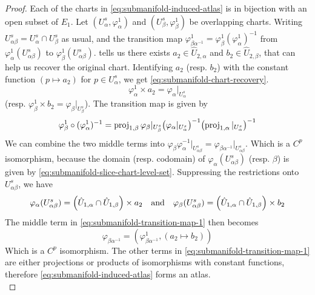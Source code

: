 \documentclass[../main-manifolds.tex]{subfiles}
\begin{document}
\begin{proof}
    Each of the charts in \cref{eq:submanifold-induced-atlas} is in bijection with an open subset of $E_1$. Let $(U^s_{\alpha}, \varphi^1_\alpha)$ and $(U^s_{\beta}, \varphi^1_\beta)$ be overlapping charts. Writing $U^s_{\alpha\beta} = U^s_{\alpha}\cap U^s_{\beta}$ as usual, and the transition map $\varphi^1_{\beta\alpha^{-1}} = \varphi^1_{\beta}(\varphi^1_{\alpha})^{-1}$ from $\varphi_{\alpha}^1(U_{\alpha\beta}^s)$ to $\varphi_{\beta}^1(U_{\alpha\beta}^s)$.  tells us there exists $a_2\in \hat{U}_{2,\alpha}$ and $b_2\in \hat{U}_{2,\beta}$, that can help us recover the original chart. Identifying $a_2$ (resp. $b_2$) with the constant function $(p\mapsto a_2)$ for $p\in U_{\alpha}^s$, we get \cref{eq:submanifold-chart-recovery}.
    \begin{equation}\label{eq:submanifold-chart-recovery}
    \varphi^1_{\alpha}\times a_2 = \varphi_{\alpha}\vert_{U^s_{\alpha}}
    \end{equation}
    (resp. $\varphi^1_{\beta}\times b_2 = \varphi_{\beta}\vert_{U^s_{\beta}}$). The transition map is given by
    \begin{equation}\label{eq:submanifold-transition-map-1}
    \varphi^1_{\beta}\circ (\varphi^1_{\alpha})^{-1} = \operatorname{proj}_{1,\beta}\varphi_{\beta}\vert_{U^s_{\beta}}\qty(\varphi_{\alpha}\vert_{U^s_{\alpha}})^{-1}\qty(\operatorname{proj}_{1,\alpha}\vert_{U^s_{\alpha}})^{-1}    
    \end{equation}
    We can combine the two middle terms into $\varphi_{\beta}\varphi_{\alpha}^{-1}\vert_{U^s_{\alpha\beta}}=\varphi_{\beta\alpha^{-1}}\vert_{U^s_{\alpha\beta}}$. Which is a $C^p$ isomorphism, because the domain (resp. codomain) of $\varphi_{\alpha}(U^s_{\alpha\beta})$ (resp. $\beta$) is given by \cref{eq:submanifold-slice-chart-level-set}. Suppressing the restrictions onto $U^s_{\alpha\beta}$, we have
    \[
        \varphi_{\alpha}(U^s_{\alpha\beta}) = \qty(\hat{U}_{1,\alpha}\cap\hat{U}_{1,\beta})\times a_2 \qqtext{and}\varphi_{\beta}(U^s_{\alpha\beta}) = \qty(\hat{U}_{1,\alpha}\cap\hat{U}_{1,\beta})\times b_2
    \]
    The middle term in \cref{eq:submanifold-transition-map-1} then becomes
    \[
        \varphi_{\beta\alpha^{-1}} = (\varphi^{1}_{\beta\alpha^{-1}}, (a_2\mapsto b_2))
    \]
    Which is a $C^p$ isomorphism. The other terms in \cref{eq:submanifold-transition-map-1} are either projections or products of isomorphisms with constant functions, therefore \cref{eq:submanifold-induced-atlas} forms an atlas.\\


\end{proof}
\end{document}
